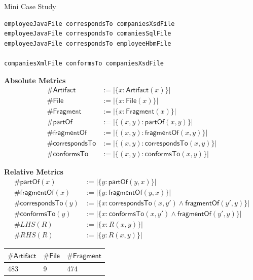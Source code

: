 \documentclass{beamer}
\newcommand{\Artifact}{\textsf{Artifact}}
\newcommand{\File}{\textsf{File}}
\newcommand{\Fragment}{\textsf{Fragment}}
\newcommand{\partOf}{\textsf{partOf}}
\newcommand{\fragmentOf}{\textsf{fragmentOf}}
\newcommand{\correspondsTo}{\textsf{correspondsTo}}
\newcommand{\conformsTo}{\textsf{conformsTo}}
\begin{document}
\begin{frame}{Mini Case Study}
\begin{lstlisting}
employeeJavaFile correspondsTo companiesXsdFile
employeeJavaFile correspondsTo comaniesSqlFile
employeeJavaFile correspondsTo employeeHbmFile

companiesXmlFile conformsTo companiesXsdFile
\end{lstlisting}
\pagebreak
\begin{center}
\textbf{Absolute Metrics}
\begin{align*}
\#\Artifact &:= |\{ x : \Artifact(x) \}| \\
\#\File &:= |\{ x : \File(x) \}| \\
\#\Fragment &:= |\{ x : \Fragment(x) \}|\\
\#\partOf &:= |\{ (x,y) : \partOf(x,y) \}| \\
\#\fragmentOf &:= |\{ (x,y) : \fragmentOf(x,y) \}| \\
\#\correspondsTo &:= |\{ (x,y) : \correspondsTo(x,y) \}| \\
\#\conformsTo &:= |\{ (x,y) : \conformsTo(x,y) \}| 
\end{align*}
\end{center}
\pagebreak
\begin{center}
\textbf{Relative Metrics}
\begin{align*}
\#\partOf(x) &:= |\{ y : \partOf(y,x) \}| \\
\#\fragmentOf(x) &:= |\{ y : \fragmentOf(y,x) \}| \\
\#\correspondsTo(y) &:=
|\{ x : \correspondsTo(x,y') \wedge \fragmentOf(y',y)  \}|
\\
\#\conformsTo(y) &:=
|\{ x : \conformsTo(x,y') \wedge \fragmentOf(y',y)  \}|\\
\#LHS(R) &:= |\{ x : R(x,y) \}| \\
\#RHS(R) &:= |\{ y : R(x,y) \}| 
\end{align*}
\end{center}
\pagebreak
\begin{center}
\begin{tabular}{|l|l|l|}
\hline
$\#\Artifact$ & $\#\File$ & $\#\Fragment$
\\ \hline
483 & 9 & 474 
\\ \hline
\end{tabular}


\end{center}
\end{frame}
\end{document}
